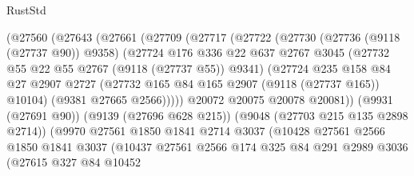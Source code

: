 \begin{lexlean}{RustStd}
\begin{coremodule}
                        (@27560
                          (@27643
                            (@27661
                              (@27709
                                (@27717
                                  (@27722
                                    (@27730
                                      (@27736 (@9118 (@27737 @90)) @9358)
                                      (@27724
                                        @176
                                        @336
                                        @22
                                        @637
                                        @2767
                                        @3045
                                        (@27732 @55 @22 @55 @2767 (@9118 (@27737 @55)) @9341)
                                        (@27724
                                          @235
                                          @158
                                          @84
                                          @27
                                          @2907
                                          @2727
                                          (@27732 @165 @84 @165 @2907 (@9118 (@27737 @165)) @10104)
                                          (@9381 @27665 @2566)))))
                                  @20072
                                  @20075
                                  @20078
                                  @20081))
                              (@9931 (@27691 @90))
                              (@9139 (@27696 @628 @215))
                              (@9048 (@27703 @215 @135 @2898 @2714))
                              (@9970
                                @27561
                                @1850
                                @1841
                                @2714
                                @3037
                                (@10428
                                  @27561
                                  @2566
                                  @1850
                                  @1841
                                  @3037
                                  (@10437
                                    @27561
                                    @2566
                                    @174
                                    @325
                                    @84
                                    @291
                                    @2989
                                    @3036
                                    (@27615
                                      @327
                                      @84
                                      @10452

\end{coremodule}
\end{lexlean}
